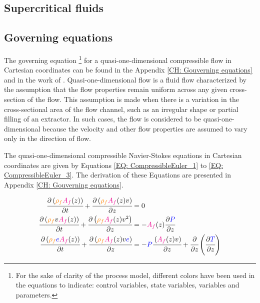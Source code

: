 \documentclass[a4paper,fleqn]{cas-dc}
\begin{document}
\subsection{Supercritical fluids} \label{CH: Thermodynamic}
%


%

\subsection{Governing equations} \label{CH:Governing_equations_chapter}
The governing equation \footnote{For the sake of clarity of the process model, different colors have been used in the equations to indicate: 
	{\color{red}control variables},
	{\color{blue}state variables},
	{\color{orange}variables} and
	{\color{magenta}parameters}.} for a quasi-one-dimensional compressible flow in Cartesian coordinates can be found in the Appendix \ref{CH: Gouverning equations} and in the work of \citet{Anderson1995}. Quasi-one-dimensional flow is a fluid flow characterized by the assumption that the flow properties remain uniform across any given cross-section of the flow. This assumption is made when there is a variation in the cross-sectional area of the flow channel, such as an irregular shape or partial filling of an extractor. In such cases, the flow is considered to be quasi-one-dimensional because the velocity and other flow properties are assumed to vary only in the direction of flow.

The quasi-one-dimensional compressible Navier-Stokes equations in Cartesian coordinates are given by Equations \ref{EQ: CompressibleEuler_1} to \ref{EQ: CompressibleEuler_3}. The derivation of these Equations are presented in Appendix \ref{CH: Gouverning equations}.

{\footnotesize
	\begin{align}
		\label{EQ: CompressibleEuler_1}
		\cfrac{\partial \left( {\color{orange}\rho_f} {\color{magenta}A_f}(z) \right) }{\partial t} + \cfrac{\partial \left( {\color{orange}\rho_f} {\color{magenta}A_f}(z) v \right)}{\partial z} &= 0 \\
		\cfrac{\partial \left( {\color{orange}\rho_f} v {\color{magenta}A_f}(z) \right) }{\partial t} + \cfrac{\partial \left( {\color{orange}\rho_f} {\color{magenta}A_f}(z) v^2 \right)}{\partial z} &= -{\color{magenta}A_f}(z) \cfrac{\partial {\color{blue}P}}{\partial z} \label{EQ: CompressibleEuler_2} \\
		\cfrac{\partial \left( {\color{orange}\rho_f} {\color{blue}e} {\color{magenta}A_f}(z) \right) }{\partial t} + \cfrac{\partial \left( {\color{orange}\rho_f} {\color{magenta}A_f}(z) v {\color{blue}e}\right)}{\partial z} &= -{\color{blue}P}\cfrac{\left( {\color{magenta}A_f}(z) v \right)}{\partial z} + \cfrac{\partial}{\partial z} \left( \cfrac{\partial {\color{blue}T}}{\partial z} \right)   
		\label{EQ: CompressibleEuler_3}
	\end{align}  
}
\end{document}
